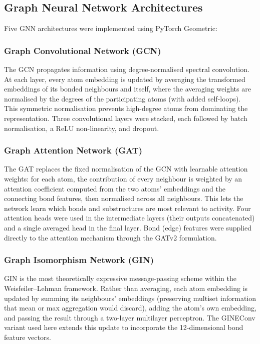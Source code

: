 \subsection{Graph Neural Network Architectures}

Five GNN architectures were implemented using PyTorch Geometric:

\subsubsection{Graph Convolutional Network (GCN)}

The GCN propagates information using degree-normalised spectral convolution. At
each layer, every atom embedding is updated by averaging the transformed
embeddings of its bonded neighbours and itself, where the averaging weights are
normalised by the degrees of the participating atoms (with added self-loops). This
symmetric normalisation prevents high-degree atoms from dominating the
representation. Three convolutional layers were stacked, each followed by batch
normalisation, a ReLU non-linearity, and dropout.

\subsubsection{Graph Attention Network (GAT)}

The GAT replaces the fixed normalisation of the GCN with learnable attention
weights: for each atom, the contribution of every neighbour is weighted by an
attention coefficient computed from the two atoms' embeddings and the connecting
bond features, then normalised across all neighbours. This lets the network learn
which bonds and substructures are most relevant to activity. Four attention heads
were used in the intermediate layers (their outputs concatenated) and a single
averaged head in the final layer. Bond (edge) features were supplied directly to
the attention mechanism through the GATv2 formulation.

\subsubsection{Graph Isomorphism Network (GIN)}

GIN is the most theoretically expressive message-passing scheme within the
Weisfeiler--Lehman framework. Rather than averaging, each atom embedding is updated
by summing its neighbours' embeddings (preserving multiset information that mean or
max aggregation would discard), adding the atom's own embedding, and passing the
result through a two-layer multilayer perceptron. The GINEConv variant used here
extends this update to incorporate the 12-dimensional bond feature vectors.

